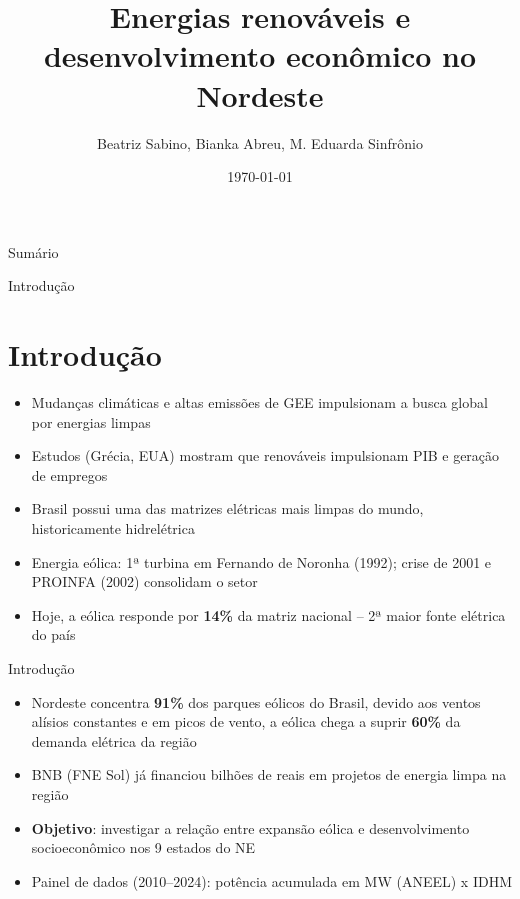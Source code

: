 \documentclass[11pt]{beamer}
\author[UFCG]{Beatriz Sabino, Bianka Abreu, M. Eduarda Sinfrônio}
\title{Energias renováveis e desenvolvimento econômico no Nordeste}
\institute{UFCG-UAEF}
\date{\today}
\begin{document}
\begin{frame}
\titlepage
\end{frame}
\begin{frame}{Sumário}
		\centering
		\tableofcontents
\end{frame}
\begin{frame}{Introdução}
\section{Introdução}
\begin{itemize}
    \item Mudanças climáticas e altas emissões de GEE impulsionam a busca global por energias limpas
    \item Estudos (Grécia, EUA) mostram que renováveis impulsionam PIB e geração de empregos
    \item Brasil possui uma das matrizes elétricas mais limpas do mundo, historicamente hidrelétrica
    \item Energia eólica: 1ª turbina em Fernando de Noronha (1992); crise de 2001 e PROINFA (2002) consolidam o setor
    \item Hoje, a eólica responde por \textbf{14\%} da matriz nacional -- 2ª maior fonte elétrica do país
\end{itemize}
\end{frame}
\begin{frame}{Introdução}
\begin{itemize}
   \item Nordeste concentra \textbf{91\%} dos parques eólicos do Brasil, devido aos ventos alísios constantes e em picos de vento, a eólica chega a suprir \textbf{60\%} da demanda elétrica da região 
    \item BNB (FNE Sol) já financiou bilhões de reais em projetos de energia limpa na região
    \item \textbf{Objetivo}: investigar a relação entre expansão eólica e desenvolvimento socioeconômico nos 9 estados do NE
    \item Painel de dados (2010--2024): potência acumulada em MW (ANEEL) x IDHM
\end{itemize}
\end{frame}
\end{document}
